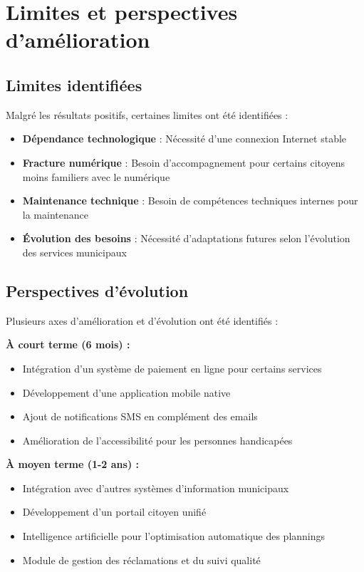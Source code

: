 \section*{Limites et perspectives d'amélioration}

\subsection*{Limites identifiées}

Malgré les résultats positifs, certaines limites ont été identifiées :

\begin{itemize}
    \item \textbf{Dépendance technologique} : Nécessité d'une connexion Internet stable
    \item \textbf{Fracture numérique} : Besoin d'accompagnement pour certains citoyens moins familiers avec le numérique
    \item \textbf{Maintenance technique} : Besoin de compétences techniques internes pour la maintenance
    \item \textbf{Évolution des besoins} : Nécessité d'adaptations futures selon l'évolution des services municipaux
\end{itemize}

\subsection*{Perspectives d'évolution}

Plusieurs axes d'amélioration et d'évolution ont été identifiés :

\textbf{À court terme (6 mois) :}
\begin{itemize}
    \item Intégration d'un système de paiement en ligne pour certains services
    \item Développement d'une application mobile native
    \item Ajout de notifications SMS en complément des emails
    \item Amélioration de l'accessibilité pour les personnes handicapées
\end{itemize}

\textbf{À moyen terme (1-2 ans) :}
\begin{itemize}
    \item Intégration avec d'autres systèmes d'information municipaux
    \item Développement d'un portail citoyen unifié
    \item Intelligence artificielle pour l'optimisation automatique des plannings
    \item Module de gestion des réclamations et du suivi qualité
\end{itemize}

